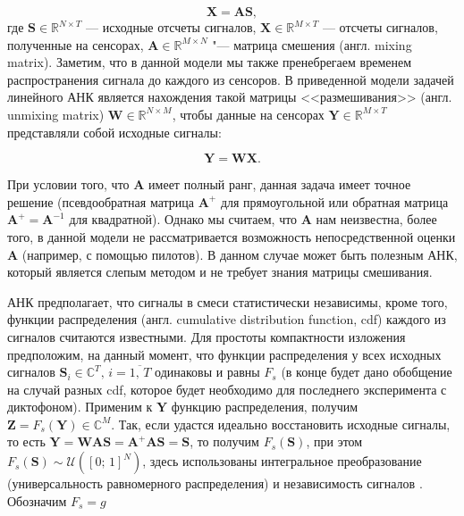\documentclass[a4paper,12pt]{article}
\begin{document}
	\begin{equation}
		\mathbf{X} = \mathbf{A} \mathbf{S},
	\end{equation} 
	где $\mathbf{S} \in \mathbb{R}^{N \times T}$ --- исходные отсчеты сигналов, $\mathbf{X} \in \mathbb{R}^{M \times T} $ ---  отсчеты сигналов, полученные на сенсорах, $\mathbf{A} \in \mathbb{R}^{M \times N} $ "--- матрица смешения (англ. mixing matrix). Заметим, что в данной модели мы также пренебрегаем временем распространения сигнала до каждого из сенсоров. В приведенной модели задачей линейного АНК является нахождения такой матрицы <<размешивания>> (англ. unmixing matrix) $\mathbf{W} \in \mathbb{R}^{N \times M} $, чтобы данные на сенсорах $\mathbf{Y} \in \mathbb{R}^{M \times T}$ представляли собой исходные сигналы:
	
	\begin{equation}
		\mathbf{Y} = \mathbf{W} \mathbf{X}.
	\end{equation}
	
	При условии того, что $\mathbf{A}$ имеет полный ранг, данная задача имеет точное решение (псевдообратная матрица $\mathbf{A}^+$ для прямоугольной или обратная матрица $\mathbf{A}^+=\mathbf{A}^{-1}$ для квадратной). Однако мы считаем, что $\mathbf{A}$ нам неизвестна, более того, в данной модели не рассматривается возможность непосредственной оценки $\mathbf{A}$ (например, с помощью пилотов). В данном случае может быть полезным АНК, который является слепым методом и не требует знания матрицы смешивания.
	
	АНК предполагает, что сигналы в смеси статистически независимы, кроме того, функции распределения (англ. cumulative distribution function, cdf) каждого из сигналов считаются известными. Для простоты компактности изложения предположим, на данный момент, что функции распределения у всех исходных сигналов $\mathbf{S}_i \in \mathbb{C}^T,\, i=\overline{1,\,T}$ одинаковы и равны $F_s$ (в конце будет дано обобщение на случай разных cdf, которое будет необходимо для последнего эксперимента с диктофоном). Применим к $\mathbf{Y}$ функцию распределения, получим $\mathbf{Z} = F_s(\mathbf{Y})\in \mathbb{C}^{M}$. Так, если удастся идеально восстановить исходные сигналы, то есть $\mathbf{Y} = \mathbf{W} \mathbf{A} \mathbf{S} = \mathbf{A}^+ \mathbf{A} \mathbf{S} =  \mathbf{S}$, то получим $F_s(\mathbf{S})$, при этом $F_s(\mathbf{S}) \sim \mathcal{U}([0;\,1]^N)$, здесь использованы интегральное преобразование (универсальность равномерного распределения) и независимость сигналов \cite{casella2002stat}. Обозначим $F_s = g$
	
\end{document}
